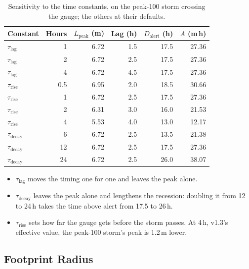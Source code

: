 \documentclass[11pt,a4paper]{article}
\begin{document}
\begin{table}[H]
    \centering
    \caption{Sensitivity to the time constants, on the peak-100 storm crossing the gauge; the others at their defaults.}
    \label{tab:time_constants}
    \begin{tabular}{lrrrrr}
        \toprule
        \textbf{Constant} & \textbf{Hours} & \textbf{$L_{\text{peak}}$ (m)} & \textbf{Lag (h)} & \textbf{$D_{\text{alert}}$ (h)} & \textbf{$A$ (m\,h)} \\
        \midrule
        $\tau_{\text{lag}}$ & 1 & 6.72 & 1.5 & 17.5 & 27.36 \\
        $\tau_{\text{lag}}$ & 2 & 6.72 & 2.5 & 17.5 & 27.36 \\
        $\tau_{\text{lag}}$ & 4 & 6.72 & 4.5 & 17.5 & 27.36 \\
        $\tau_{\text{rise}}$ & 0.5 & 6.95 & 2.0 & 18.5 & 30.66 \\
        $\tau_{\text{rise}}$ & 1 & 6.72 & 2.5 & 17.5 & 27.36 \\
        $\tau_{\text{rise}}$ & 2 & 6.31 & 3.0 & 16.0 & 21.53 \\
        $\tau_{\text{rise}}$ & 4 & 5.53 & 4.0 & 13.0 & 12.17 \\
        $\tau_{\text{decay}}$ & 6 & 6.72 & 2.5 & 13.5 & 21.38 \\
        $\tau_{\text{decay}}$ & 12 & 6.72 & 2.5 & 17.5 & 27.36 \\
        $\tau_{\text{decay}}$ & 24 & 6.72 & 2.5 & 26.0 & 38.07 \\
        \bottomrule
    \end{tabular}
\end{table}

\begin{itemize}[nosep]
    \item $\tau_{\text{lag}}$ moves the timing one for one and leaves the peak alone.
    \item $\tau_{\text{decay}}$ leaves the peak alone and lengthens the recession:
          doubling it from 12 to 24\,h takes the time above alert from 17.5 to
          26\,h.
    \item $\tau_{\text{rise}}$ sets how far the gauge gets before the storm passes.
          At 4\,h, v1.3's effective value, the peak-100 storm's peak is 1.2\,m lower.
\end{itemize}

\subsection{Footprint Radius}
\end{document}

